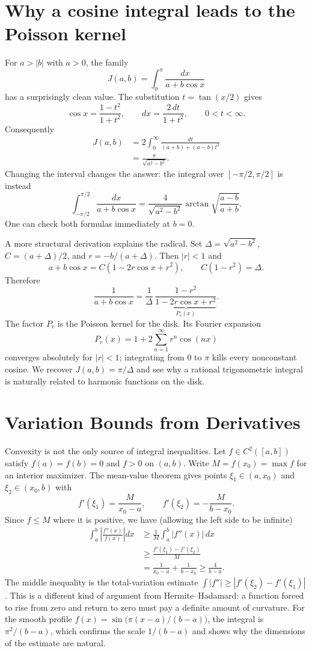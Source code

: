 \section{Why a cosine integral leads to the Poisson kernel}

For $a>|b|$ with $a>0$, the family
\[
 J(a,b)=\int_0^\pi\frac{dx}{a+b\cos x}
\]
has a surprisingly clean value. The substitution $t=\tan(x/2)$ gives
\[
 \cos x=\frac{1-t^2}{1+t^2},\qquad
 dx=\frac{2\,dt}{1+t^2},\qquad 0<t<\infty.
\]
Consequently
\[
 \begin{aligned}
 J(a,b)
 &=2\int_0^\infty\frac{dt}{(a+b)+(a-b)t^2}\\
 &=\boxed{\frac{\pi}{\sqrt{a^2-b^2}}}.
 \end{aligned}
\]
Changing the interval changes the answer: the integral over
$[-\pi/2,\pi/2]$ is instead
\[
 \int_{-\pi/2}^{\pi/2}\frac{dx}{a+b\cos x}
 =\frac{4}{\sqrt{a^2-b^2}}
   \arctan\sqrt{\frac{a-b}{a+b}}.
\]
One can check both formulas immediately at $b=0$.

A more structural derivation explains the radical. Set
$\Delta=\sqrt{a^2-b^2}$,
$C=(a+\Delta)/2$, and $r=-b/(a+\Delta)$. Then $|r|<1$ and
\[
 a+b\cos x=C(1-2r\cos x+r^2),
 \qquad C(1-r^2)=\Delta.
\]
Therefore
\[
 \frac1{a+b\cos x}
 =\frac1\Delta\,
    \underbrace{\frac{1-r^2}{1-2r\cos x+r^2}}_{P_r(x)}.
\]
The factor $P_r$ is the Poisson kernel for the disk. Its Fourier expansion
\[
 P_r(x)=1+2\sum_{n=1}^\infty r^n\cos(nx)
\]
converges absolutely for $|r|<1$; integrating from $0$ to $\pi$ kills every nonconstant cosine. We recover $J(a,b)=\pi/\Delta$ and see why a rational trigonometric integral is naturally related to harmonic functions on the disk.

\section{Variation Bounds from Derivatives}

Convexity is not the only source of integral inequalities. Let
$f\in C^2([a,b])$ satisfy $f(a)=f(b)=0$ and $f>0$ on $(a,b)$.
Write $M=f(x_0)=\max f$ for an interior maximizer. The mean-value theorem gives points
$\xi_1\in(a,x_0)$ and $\xi_2\in(x_0,b)$ with
\[
 f'(\xi_1)=\frac{M}{x_0-a},
 \qquad f'(\xi_2)=-\frac{M}{b-x_0}.
\]
Since $f\le M$ where it is positive, we have (allowing the left side to be infinite)
\[
 \begin{aligned}
 \int_a^b\left|\frac{f''(x)}{f(x)}\right|dx
 &\ge\frac1M\int_a^b|f''(x)|\,dx\\
 &\ge\frac{f'(\xi_1)-f'(\xi_2)}M\\
 &=\frac1{x_0-a}+\frac1{b-x_0}
 \ge\boxed{\frac4{b-a}}.
 \end{aligned}
\]
The middle inequality is the total-variation estimate
$\int|f''|\ge|f'(\xi_2)-f'(\xi_1)|$.
This is a different kind of argument from Hermite--Hadamard: a function forced to rise from zero and return to zero must pay a definite amount of curvature. For the smooth profile
$f(x)=\sin\bigl(\pi(x-a)/(b-a)\bigr)$, the integral is
$\pi^2/(b-a)$, which confirms the scale $1/(b-a)$ and shows why the dimensions of the estimate are natural.

